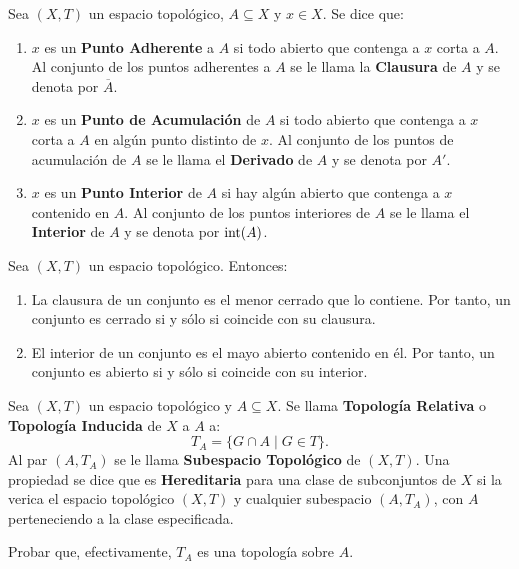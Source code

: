 \documentclass[cursovd_portada.tex]{subfiles}
\begin{document}
\begin{defi}
Sea $(X,T)$ un espacio topológico, $A\subseteq X$ y $x\in X$. Se dice que:
\begin{enumerate}
\item $x$ es un {\bf Punto Adherente} a $A$ si todo abierto que contenga a $x$ corta a $A$. Al conjunto de los
puntos adherentes a $A$ se le llama la {\bf Clausura} de $A$ y se denota por $\overline{A}$.
\item $x$ es un {\bf Punto de Acumulación} de $A$ si todo abierto que contenga a $x$ corta a $A$ en algún punto distinto
de $x$. Al conjunto de los puntos de acumulación de $A$ se le llama el {\bf Derivado} de $A$ y se denota por $A'$.
\item $x$ es un {\bf Punto Interior} de $A$ si hay algún abierto que contenga a $x$ contenido en $A$. Al conjunto de los
puntos interiores de $A$ se le llama el {\bf Interior} de $A$ y se denota por ${\rm int}(A)$.
\end{enumerate}
\end{defi}

\newpage

\begin{prop}
Sea $(X,T)$ un espacio topológico. Entonces:
\begin{enumerate}
\item La clausura de un conjunto es el menor cerrado que lo contiene. Por tanto, un conjunto es cerrado si y sólo
si coincide con su clausura.
\item El interior de un conjunto es el mayo abierto contenido en él. Por tanto, un conjunto es abierto si y sólo
si coincide con su interior.
\end{enumerate}
\end{prop}
\begin{defi}
Sea $(X,T)$ un espacio topológico y $A\subseteq X$. Se llama {\bf To\-po\-lo\-gía Relativa} o {\bf Topología
Inducida} de $X$ a $A$ a:
$$T_A=\{G\cap A\mid G\in T\}.$$
\hs Al par $(A,T_A)$ se le llama {\bf Subespacio Topológico} de $(X,T)$. Una propiedad se dice que es {\bf
Hereditaria} para una clase de subconjuntos de $X$ si la verica el espacio topológico $(X,T)$ y cualquier
subespacio $(A,T_A)$, con $A$ perteneciendo a la clase especificada.
\end{defi}
\begin{ejer}
{\rm Probar que, efectivamente, $T_A$ es una topología sobre $A$.}
\end{ejer}
\end{document}
